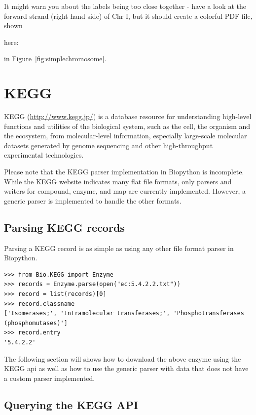 \documentclass{report}
\begin{document}
It might warn you about the labels being too close together - have a look
at the forward strand (right hand side) of Chr I, but it should create a
colorful PDF file, shown
\begin{htmlonly}
here:


\end{htmlonly}
\begin{latexonly}
in Figure~\ref{fig:simplechromosome}.
\end{latexonly}

\chapter{KEGG}
\label{chap:kegg}

KEGG (\url{http://www.kegg.jp/}) is a database resource for understanding high-level functions and utilities of the biological system, such as the cell, the organism and the ecosystem, from molecular-level information, especially large-scale molecular datasets generated by genome sequencing and other high-throughput experimental technologies.

Please note that the KEGG parser implementation in Biopython is incomplete. While the KEGG website indicates many flat file formats, only parsers and writers for compound, enzyme, and map are currently implemented. However, a generic parser is implemented to handle the other formats.

\section{Parsing KEGG records}
Parsing a KEGG record is as simple as using any other file format parser in Biopython. 

\begin{verbatim}
>>> from Bio.KEGG import Enzyme
>>> records = Enzyme.parse(open("ec:5.4.2.2.txt"))
>>> record = list(records)[0]
>>> record.classname
['Isomerases;', 'Intramolecular transferases;', 'Phosphotransferases (phosphomutases)']
>>> record.entry
'5.4.2.2'
\end{verbatim}

The following section will shows how to download the above enzyme using the KEGG api as well as how to use the generic parser with data that does not have a custom parser implemented.

\section{Querying the KEGG API}
\end{document}
